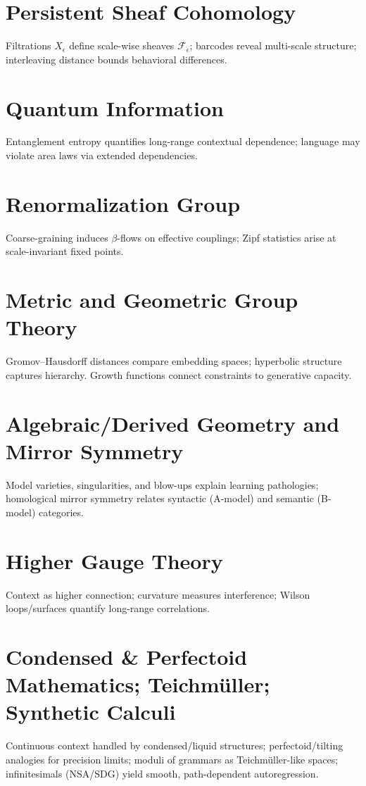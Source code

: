 \documentclass[12pt,a4paper]{article}
\theoremstyle{definition}
\begin{document}
\section{Persistent Sheaf Cohomology}
Filtrations $X_\epsilon$ define scale-wise sheaves $\mathcal{F}_\epsilon$; barcodes reveal multi-scale structure; interleaving distance bounds behavioral differences.

\section{Quantum Information}
Entanglement entropy quantifies long-range contextual dependence; language may violate area laws via extended dependencies.

\section{Renormalization Group}
Coarse-graining induces $\beta$-flows on effective couplings; Zipf statistics arise at scale-invariant fixed points.

\section{Metric and Geometric Group Theory}
Gromov–Hausdorff distances compare embedding spaces; hyperbolic structure captures hierarchy. Growth functions connect constraints to generative capacity.

\section{Algebraic/Derived Geometry and Mirror Symmetry}
Model varieties, singularities, and blow-ups explain learning pathologies; homological mirror symmetry relates syntactic (A-model) and semantic (B-model) categories.

\section{Higher Gauge Theory}
Context as higher connection; curvature measures interference; Wilson loops/surfaces quantify long-range correlations.

\section{Condensed \& Perfectoid Mathematics; Teichmüller; Synthetic Calculi}
Continuous context handled by condensed/liquid structures; perfectoid/tilting analogies for precision limits; moduli of grammars as Teichmüller-like spaces; infinitesimals (NSA/SDG) yield smooth, path-dependent autoregression.
\end{document}
